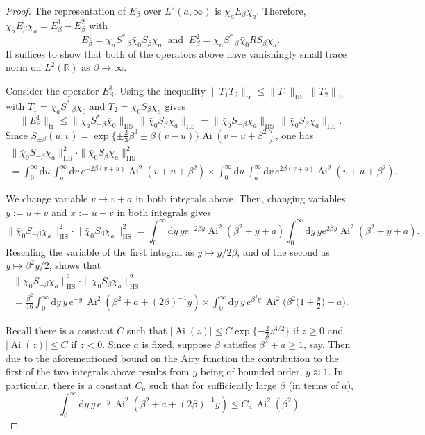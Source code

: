 \documentclass[10pt]{amsart}
\theoremstyle{definition}\newtheorem{defi}[theo]{Definition}\newtheorem{rema}[theo]{Remark}\newtheorem{exam}[theo]{Example}\newtheorem{exem}[theo]{Example}\newtheorem{nota}[theo]{Notation}
\newcommand*{\dd}{\mathrm{d}}
\newcommand*{\dy}{\dd y}
\newcommand*{\du}{\dd u}
\newcommand*{\dv}{\dd v}
\DeclareMathOperator{\tr}{tr}
\DeclareMathOperator{\hs}{HS}
\DeclareMathOperator{\Ai}{Ai}
\newcommand{\R}{\mathbb{R}}
\begin{document}
\begin{proof}
The representation of $E_{\beta}$ over $L^2(a,\infty)$ is $\chi_a E_{\beta} \chi_a$. Therefore, $\chi_a E_{\beta} \chi_a= E^1_{\beta} - E^2_{\beta}$ with
\[
E^1_{\beta} = \chi_a S_{-\beta}^{*} \bar{\chi}_0 S_{\beta} \chi_a\;\; \text{and}\;\;
E^2_{\beta} = \chi_a S_{-\beta}^{*} \bar{\chi}_0 R S_{\beta} \chi_a.
\]
If suffices to show that both of the operators above have vanishingly small trace norm on $L^2(\R)$ as $\beta \to \infty$.

Consider the operator $E^1_{\beta}$. Using the inequality $\| T_1 T_2 \|_{\tr} \leq \|T_1\|_{\hs} \,\|T_2\|_{\hs}$ with $T_1 = \chi_a S_{-\beta}^{*} \bar{\chi}_0$ and $T_2 = \bar{\chi}_0 S_{\beta} \chi_a$ gives
\[
\|E^1_{\beta}\|_{\tr} \leq \| \chi_a S_{-\beta}^{*} \bar{\chi}_0 \|_{\hs}\, \| \bar{\chi}_0 S_{\beta} \chi_a \|_{\hs}
= \| \bar{\chi}_0 S_{-\beta} \chi_a \|_{\hs}\, \| \bar{\chi}_0 S_{\beta} \chi_a \|_{\hs}.
\]
Since $S_{\pm \beta}(u,v) = \exp \{\pm \frac{2}{3}\beta^3 \pm \beta(v-u)\} \Ai(v-u+\beta^2)$, one has
\begin{multline*}
\| \bar{\chi}_0 S_{-\beta} \chi_a\|^2_{\hs} \cdot \| \bar{\chi}_0 S_{\beta} \chi_a \|^2_{\hs} \\
=\int_0^{\infty} \du \, \int_a^{\infty} \dv \, e^{-2 \beta(v+u)} \Ai^2(v+u+\beta^2) \times 
\int_0^{\infty} \du \, \int_a^{\infty} \dv \, e^{2 \beta(v+u)} \Ai^2(v+u+\beta^2).
\end{multline*}

We change variable $v \mapsto v+a$ in both integrals above. Then, changing variables $y := u+v$ and $x := u-v$ in both integrals gives
\[
\| \bar{\chi}_0 S_{-\beta} \chi_a\|^2_{\hs} \cdot \| \bar{\chi}_0 S_{\beta} \chi_a \|^2_{\hs}=
\int_0^{\infty} \!\dy \, y e^{-2\beta y} \Ai^2(\beta^2 + y +a) \int_0^{\infty} \!\dy \, y e^{2\beta y} \Ai^2(\beta^2+y+a).
\]
Rescaling the variable of the first integral as $y \mapsto y/2\beta$, and of the second as $y \mapsto \beta^2 y/2$, shows that
\begin{multline}\label{eqn:error1b}
\| \bar{\chi}_0 S_{-\beta} \chi_a\|^2_{\hs} \cdot \| \bar{\chi}_0 S_{\beta} \chi_a \|^2_{\hs} \\
=\frac{\beta^2}{16} \int_0^{\infty}\dy\, y\, e^{-y}\, \Ai^2(\beta^2 + a + (2\beta)^{-1}y) \times  \int_0^{\infty}\dy\, y\, e^{\beta^3 y} \, \Ai^2 \Big (\beta^2 \Big(1+\frac{y}{2}\Big)+ a \Big).
\end{multline}

Recall there is a constant $C$ such that $|\Ai(z)| \leq C \exp \{ -\frac{2}{3}z^{3/2} \}$ if $z \geq 0$ and $|\Ai(z)| \leq C$ if $z < 0$. Since $a$ is fixed, suppose $\beta$ satisfies $\beta^2 + a \geq 1$, say. Then due to the aforementioned bound on the Airy function the contribution to the first of the two integrals above results from $y$ being of bounded order, $y \approx 1$. In particular, there is a constant $C_a$ such that for sufficiently large $\beta$ (in terms of $a$),
\[
\int_0^{\infty}\dy\, y\, e^{-y}\, \Ai^2(\beta^2 + a + (2\beta)^{-1}y) \leq C_a \, \Ai^2(\beta^2).
\]


\end{proof}
\end{document}
